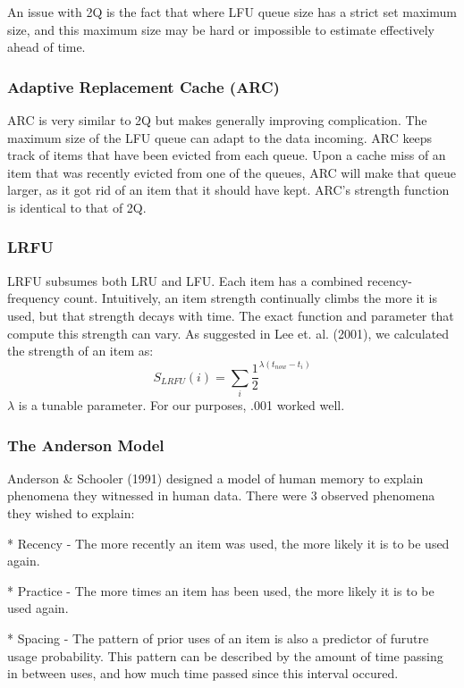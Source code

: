 \documentclass[10pt,letterpaper]{article}
\begin{document}
An issue with 2Q is the fact that where LFU queue size has a strict set maximum size, and this maximum size
may be hard or impossible to estimate effectively ahead of time. 

\subsubsection{Adaptive Replacement Cache (ARC)}

ARC is very similar to 2Q but makes generally improving complication. The maximum size of
the LFU queue can adapt to the data incoming. ARC keeps track of items that
have been evicted from each queue. Upon a cache miss of an item that was recently evicted
from one of the queues, ARC will make that queue larger, as it got rid 
of an item that it should have kept. ARC's strength function is identical to
that of 2Q.

\subsubsection{LRFU}

LRFU subsumes both LRU and LFU. Each item has a combined recency-frequency count.
Intuitively, an item strength continually climbs the more it is used, but that
strength decays with time. The exact function and parameter that compute this strength can
vary. As suggested in Lee et. al. (2001), we calculated the strength of an item as:
$$
S_{LRFU}(i) = \sum_i \frac{1}{2}^{\lambda(t_{now} - t_i)}
$$
$\lambda$ is a tunable parameter. For our purposes, .001 worked well.

\subsubsection{The Anderson Model}

Anderson & Schooler (1991) designed a model of human memory to explain phenomena
they witnessed in human data. There were 3 observed phenomena they wished to explain:

* Recency - The more recently an item was used, the more likely it is to be used again.

* Practice - The more times an item has been used, the more likely it is to be used again.

* Spacing - The pattern of prior uses of an item is also a predictor of furutre usage
probability. This pattern can be described by the amount of time passing in between
uses, and how much time passed since this interval occured. 
\end{document}
